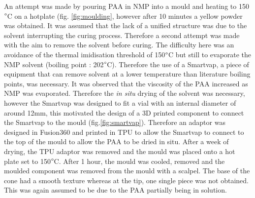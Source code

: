 An attempt was made by pouring PAA in NMP into a mould and heating to 150$\degree$C on a hotplate (fig. \ref{fig:moulding}, however after 10 minutes a yellow powder was obtained. It was assumed that the lack of a unified structure was due to the solvent interrupting the curing process. Therefore a second attempt was made with the aim to remove the solvent before curing. The difficulty here was an avoidance of the thermal imidisation threshold of 150$\degree$C but still to evaporate the NMP solvent (boiling point : 202$\degree$C). Therefore the use of a Smartvap, a piece of equipment that can remove solvent at a lower temperature than literature boiling points, was necessary. It was observed that the viscosity of the PAA increased as NMP was evaporated. Therefore the \textit{in situ} drying of the solvent was necessary, however the Smartvap was designed to fit a vial with an internal diameter of around 12mm, this motivated the design of a 3D printed component to connect the Smartvap to the mould (fig.\ref{fig:smartvap}). Therefore an adaptor was designed in Fusion360 and printed in TPU to allow the Smartvap to connect to the top of the mould to allow the PAA to be dried in situ. After a week of drying, the TPU adaptor was removed and the mould was placed onto a hot plate set to 150$\degree$C. After 1 hour, the mould was cooled, removed and the moulded component was removed from the mould with a scalpel. The base of the cone had a smooth texture whereas at the tip, one single piece was not obtained. This was again assumed to be due to the PAA partially being in solution.

 